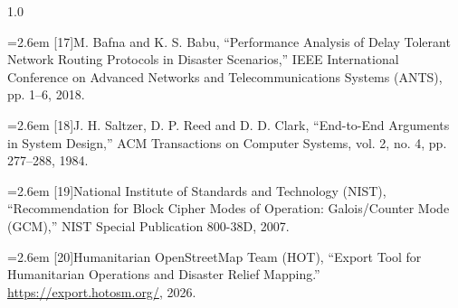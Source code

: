 \documentclass[12pt,a4paper]{report}
\newcommand{\refitem}[2]{\par\noindent\hangindent=2.6em\hangafter=1 [#1]\hspace{0.9em}#2\par\vspace{2pt}}
\begin{document}
\begin{spacing}{1.0}
\refitem{17}{M. Bafna and K. S. Babu, ``Performance Analysis of Delay Tolerant Network Routing Protocols in Disaster Scenarios,'' IEEE International Conference on Advanced Networks and Telecommunications Systems (ANTS), pp. 1--6, 2018.}
\refitem{18}{J. H. Saltzer, D. P. Reed and D. D. Clark, ``End-to-End Arguments in System Design,'' ACM Transactions on Computer Systems, vol. 2, no. 4, pp. 277--288, 1984.}
\refitem{19}{National Institute of Standards and Technology (NIST), ``Recommendation for Block Cipher Modes of Operation: Galois/Counter Mode (GCM),'' NIST Special Publication 800-38D, 2007.}
\refitem{20}{Humanitarian OpenStreetMap Team (HOT), ``Export Tool for Humanitarian Operations and Disaster Relief Mapping.'' \url{https://export.hotosm.org/}, 2026.}
\end{spacing}
\end{document}
